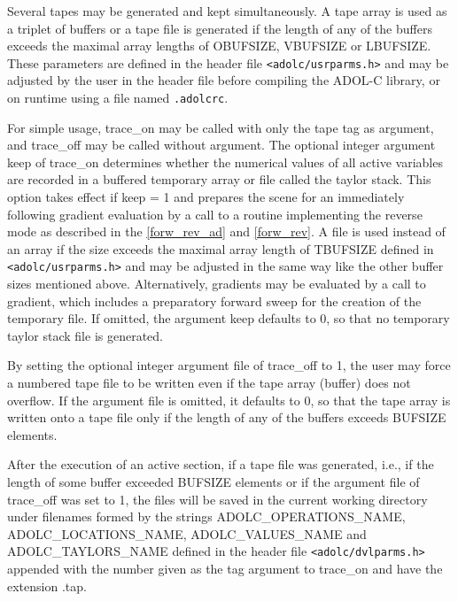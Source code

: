 \documentclass[11pt,twoside]{article}
\begin{document}
Several tapes may be generated and kept simultaneously.
A tape array is used as a triplet of buffers or a tape file is generated if
the length of any of the buffers exceeds the maximal array lengths of 
{\sf OBUFSIZE}, {\sf VBUFSIZE} or {\sf LBUFSIZE}. These parameters are
defined in the header file \verb=<adolc/usrparms.h>=
and may be adjusted by the user in the header file before compiling
the ADOL-C library, or on runtime using a file named \verb=.adolcrc=. 

For simple usage, {\sf trace\_on} may be called with only the tape
{\sf tag} as argument, and {\sf trace\_off} may be called 
without argument. The optional integer argument {\sf keep} of 
{\sf trace\_on} determines whether the numerical values of all
active variables are recorded in a buffered temporary array or file
called the taylor stack. 
This option takes effect if
{\sf keep} = 1 and prepares the scene for an immediately following
gradient evaluation by a call to a routine implementing the reverse mode
as described in the \autoref{forw_rev_ad} and \autoref{forw_rev}. A
file is used instead of an array if the size exceeds the maximal array
length of {\sf TBUFSIZE} defined in \verb=<adolc/usrparms.h>= and may
be adjusted in the same way like the other buffer sizes mentioned above.
Alternatively, gradients may be evaluated by a call
to {\sf gradient}, which includes a preparatory forward sweep
for the creation of the temporary file. If omitted, the argument 
{\sf  keep} defaults to 0, so that no temporary
taylor stack file is generated. 

By setting the optional integer argument {\sf file} of 
{\sf  trace\_off} to 1, the user may force a numbered  tape
file to be written even if the tape array (buffer) does not overflow.
If the argument {\sf file} is omitted, it 
defaults to 0, so that the tape array is written onto a tape file only 
if the length of any of the buffers exceeds {\sf [OLVT]BUFSIZE} elements.

After the execution of an active section, if a tape file was generated, i.e.,
if the length of some buffer exceeded {\sf [OLVT]BUFSIZE} elements or if the 
argument {\sf file} of {\sf trace\_off} was set to 1, the files will be
saved in the current working directory under filenames formed by 
the strings {\sf ADOLC\_OPERATIONS\_NAME}, {\sf
  ADOLC\_LOCATIONS\_NAME}, {\sf ADOLC\_VALUES\_NAME} and {\sf
  ADOLC\_TAYLORS\_NAME} defined in
the header file \verb=<adolc/dvlparms.h>= appended with the number
given as the {\sf tag} argument to {\sf trace\_on} and have the
extension {\sf .tap}.
\end{document}
